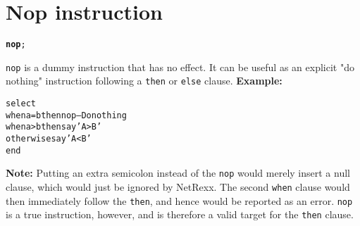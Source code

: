 \chapter{Nop instruction}
\begin{shaded}
\begin{alltt}
\textbf{nop};
\end{alltt}
\end{shaded}
 \texttt{nop} is a dummy instruction that has no effect.  It can be
useful as an explicit "do nothing" instruction following a
\texttt{then} or \texttt{else} clause.
 \textbf{Example:}
\begin{alltt}
select
  when a=b then nop           -- Do nothing
  when a>b then say 'A > B'
  otherwise     say 'A < B'
  end
\end{alltt}
\textbf{Note: }Putting an extra semicolon instead of the \texttt{nop} would
merely insert a null clause, which would just be ignored by NetRexx.
The second \texttt{when} clause would then immediately follow the
\texttt{then}, and hence would be reported as an error.
\texttt{nop} is a true instruction, however, and is therefore a valid
target for the \texttt{then} clause.
